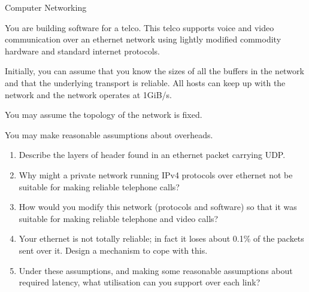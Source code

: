 \documentclass{tripos}  %
\begin{document}
\begin{question}[MockIB,year=2024,paper=2,question=11,author=rrw]{Computer Networking}


You are building software for a telco. This telco supports voice and
video communication over an ethernet network using lightly modified
commodity hardware and standard internet protocols.

Initially, you can assume that you know the sizes of all the buffers
in the network and that the underlying transport is reliable. All
hosts can keep up with the network and the network operates at 1GiB/s.

You may assume the topology of the network is fixed.

You may make reasonable assumptions about overheads.

\begin{enumerate}
\item Describe the layers of header found in an ethernet packet carrying UDP. 
\item Why might a private network running IPv4 protocols over ethernet not be suitable for making reliable telephone calls?
\item How would you modify this network (protocols and software) so that it was suitable for making reliable telephone and video calls? 
\item Your ethernet is not totally reliable; in fact it loses about 0.1\% of the packets sent over it. Design a mechanism to cope with this. 
\item Under these assumptions, and making some reasonable assumptions about required latency, what utilisation can you support over each link? 
  \end{enumerate}


  
  
\end{question}
\end{document}
